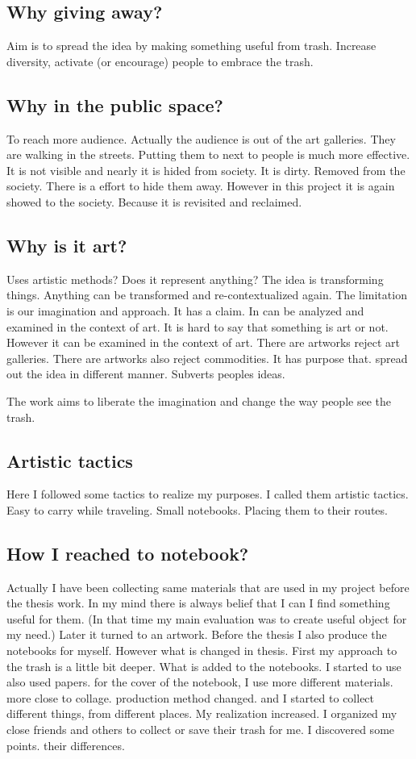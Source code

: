 \subsection{Why giving away?}
Aim is to spread the idea by making something useful from trash. Increase diversity, activate (or encourage) people to embrace the trash.

\subsection{Why in the public space?}
To reach more audience. Actually the audience is out of the art galleries. They are walking in the streets. Putting them to next to people is much more effective. It is not visible and nearly it is hided from society. It is dirty. Removed from the society. There is a effort to hide them away. However in this project it is again showed to the society. Because it is revisited and reclaimed. 

\subsection{Why is it art?}
Uses artistic methods? Does it represent anything? The idea is transforming things. Anything can be transformed and re-contextualized again. The limitation is our imagination and approach. It has a claim. In can be analyzed and examined in the context of art. It is hard to say that something is art or not. However it can be examined in the context of art. There are artworks reject art galleries. There are artworks also reject commodities. It has purpose that. spread out the idea in different manner. Subverts peoples ideas. 

The work aims to liberate the imagination and change the way people see the trash.

\subsection{Artistic tactics}
Here I followed some tactics to realize my purposes. I called them artistic tactics. Easy to carry while traveling. Small notebooks. Placing them to their routes. 

\subsection{How I reached to notebook?}
Actually I have been collecting same materials that are used in my project before the thesis work. In my mind there is always belief that I can I find something useful for them. (In that time my main evaluation was to create useful object for my need.) Later it turned to an artwork. Before the thesis I also produce the notebooks for myself. However what is changed in thesis. First my approach to the trash is a little bit deeper. What is added to the notebooks. I started to use also used papers. for the cover of the notebook, I use more different materials. more close to collage. production method changed. and I started to collect different things, from different places. My realization increased. I organized my close friends and others to collect or save their trash for me. I discovered some points. their differences. 

